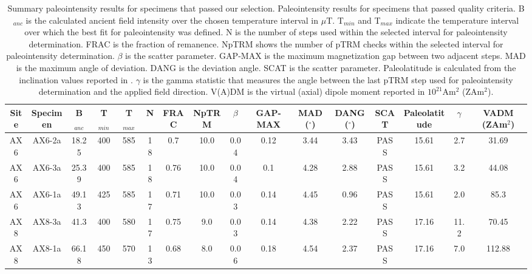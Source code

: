 \documentclass[draft]{agujournal2019}
\begin{document}
\begin{table}
\caption{\footnotesize{Summary paleointensity results for specimens that passed our selection. Paleointensity results for specimens that passed quality criteria. B$_{anc}$ is the calculated ancient field intensity over the chosen temperature interval in $\mu$T. T$_{min}$ and T$_{max}$ indicate the temperature interval over which the best fit for paleointensity was defined. N is the number of steps used within the selected interval for paleointensity determination. FRAC is the fraction of remanence. NpTRM shows the number of pTRM checks within the selected interval for paleointensity determination. $\beta$ is the scatter parameter.  GAP-MAX is the maximum magnetization gap between two adjacent steps. MAD is the maximum angle of deviation. DANG is the deviation angle. SCAT is the scatter parameter. Paleolatitude is calculated from the inclination values reported in . $\gamma$ is the gamma statistic that measures the angle between the last pTRM step used for paleointensity determination and the applied field direction. V(A)DM is the virtual (axial) dipole moment reported in $10^{21}$Am$^2$ (ZAm$^2$). }}
\centering
\begin{tabular}{cccccccccccccccc}
\hline
Site & Specimen & B$_{anc}$ & T$_{min}$ & T$_{max}$ & N    & FRAC & NpTRM & $\beta$ & GAP-MAX & MAD ($^\circ$) & DANG ($^\circ$) & SCAT & Paleolatitude & $\gamma$ & VADM (ZAm$^2$) \\
\hline
AX6  & AX6-2a   & 18.25     & 400       & 585       & 18 & 0.7  & 10.0  & 0.04    & 0.12    & 3.44           & 3.43            & PASS & 15.61         & 2.7      & 31.69          \\
AX6  & AX6-3a   & 25.39     & 400       & 585       & 18 & 0.76 & 10.0  & 0.04    & 0.1     & 4.28           & 2.88            & PASS & 15.61         & 3.2      & 44.08          \\
AX6  & AX6-1a   & 49.13     & 425       & 585       & 17 & 0.71 & 10.0  & 0.03    & 0.14    & 4.45           & 0.96            & PASS & 15.61         & 2.0      & 85.3           \\
AX8  & AX8-3a   & 41.3      & 400       & 580       & 17 & 0.75 & 9.0   & 0.03    & 0.14    & 4.38           & 2.22            & PASS & 17.16         & 11.2     & 70.45          \\
AX8  & AX8-1a   & 66.18     & 450       & 570       & 13 & 0.68 & 8.0   & 0.06    & 0.18    & 4.54           & 2.37            & PASS & 17.16         & 7.0      & 112.88         \\

\end{tabular}
\end{table}
\end{document}
